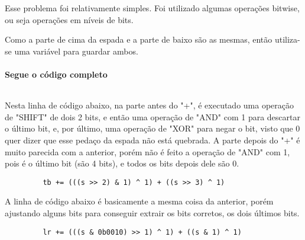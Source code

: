 Esse problema foi relativamente simples. Foi utilizado algumas operações bitwise, ou seja operações em níveis de bits.
\par Como a parte de cima da espada e a parte de baixo são as mesmas, então utiliza-se uma variável para guardar ambos.
\paragraph{Segue o código completo}
\begin{mdframed}[linewidth=0pt,backgroundcolor=codebgcolor]
    \inputminted[breaklines]{python}{../src/brokenswords/brokenswords.py}
\end{mdframed}

\par Nesta linha de código abaixo, na parte antes do "+", é executado uma operação de "SHIFT" de dois 2 bits, e então uma operação de "AND" com 1 para descartar o último bit, e, por último, uma operação de "XOR" para negar o bit, visto que 0 quer dizer que esse pedaço da espada não está quebrada. A parte depois do "+" é muito parecida com a anterior, porém não é feito a operação de "AND" com 1, pois é o último bit (são 4 bits), e todos os bits depois dele são 0.
\begin{mdframed}[linewidth=0pt,backgroundcolor=codebgcolor]
    \begin{verbatim}
         tb += (((s >> 2) & 1) ^ 1) + ((s >> 3) ^ 1)
    \end{verbatim}
\end{mdframed}

\par A linha de código abaixo é basicamente a mesma coisa da anterior, porém ajustando alguns bits para conseguir extrair os bits corretos, os dois últimos bits.
\begin{mdframed}[linewidth=0pt,backgroundcolor=codebgcolor]
    \begin{verbatim}
         lr += (((s & 0b0010) >> 1) ^ 1) + ((s & 1) ^ 1)
    \end{verbatim}
\end{mdframed}